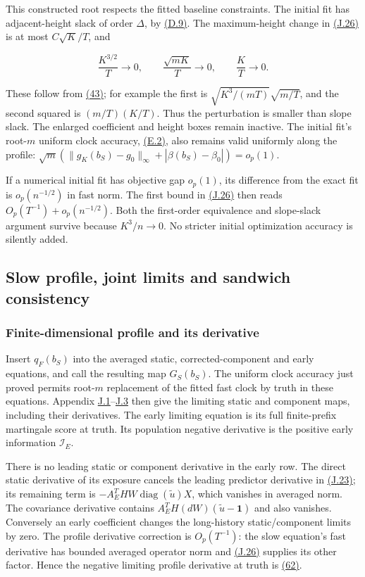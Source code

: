 \documentclass[11pt]{article}
\begin{document}
This constructed root respects the fitted baseline constraints. The initial fit has adjacent-height slack of order \(\Delta\), by \hyperref[eq:D.9]{(D.9)}. The maximum-height change in \hyperref[eq:J.26]{(J.26)} is at most \(C\sqrt K/T\), and

\begin{equation*}
\frac{K^{3/2}}T\to0,\qquad
\frac{\sqrt{mK}}T\to0,\qquad \frac KT\to0.
\tag{J.27}\label{eq:J.27}
\end{equation*}

These follow from \hyperref[eq:43]{(43)}; for example the first is \(\sqrt{K^3/(mT)}\sqrt{m/T}\), and the second squared is \((m/T)(K/T)\). Thus the perturbation is smaller than slope slack. The enlarged coefficient and height boxes remain inactive. The initial fit's root-\(m\) uniform clock accuracy, \hyperref[eq:E.2]{(E.2)}, also remains valid uniformly along the profile:
\(\sqrt m(\|g_K(b_S)-g_0\|_\infty+|\beta(b_S)-\beta_0|)=o_p(1)\).

If a numerical initial fit has objective gap \(o_p(1)\), its difference from the exact fit is \(o_p(n^{-1/2})\) in fast norm. The first bound in \hyperref[eq:J.26]{(J.26)} then reads \(O_p(T^{-1})+o_p(n^{-1/2})\). Both the first-order equivalence and slope-slack argument survive because \(K^3/n\to0\). No stricter initial optimization accuracy is silently added.

\subsection{Slow profile, joint limits and sandwich consistency}\label{sec:J.7}

\subsubsection{Finite-dimensional profile and its derivative}\label{sec:J.7.1}

Insert \(q_F(b_S)\) into the averaged static, corrected-component and early equations, and call the resulting map \(G_S(b_S)\). The uniform clock accuracy just proved permits root-\(m\) replacement of the fitted fast clock by truth in these equations. Appendix \hyperref[sec:J.1]{J.1}--\hyperref[sec:J.3]{J.3} then give the limiting static and component maps, including their derivatives. The early limiting equation is its full finite-prefix martingale score at truth. Its population negative derivative is the positive early information \(\mathcal I_E\).

There is no leading static or component derivative in the early row. The direct static derivative of its exposure cancels the leading predictor derivative in \hyperref[eq:J.23]{(J.23)}; its remaining term is \(-A_E^THW\operatorname{diag}(\widetilde u)X\), which vanishes in averaged norm. The covariance derivative contains \(A_E^TH(dW)(\widetilde u-\mathbf1)\) and also vanishes. Conversely an early coefficient changes the long-history static/component limits by zero. The profile derivative correction is \(O_p(T^{-1})\): the slow equation's fast derivative has bounded averaged operator norm and \hyperref[eq:J.26]{(J.26)} supplies its other factor. Hence the negative limiting profile derivative at truth is \hyperref[eq:62]{(62)}.
\end{document}
